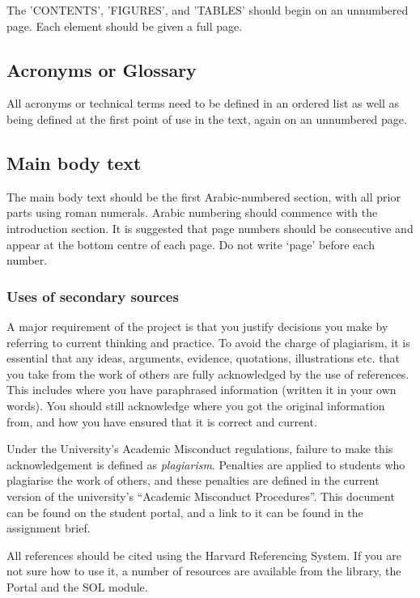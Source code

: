 The 'CONTENTS', 'FIGURES', and 'TABLES' should begin on an unnumbered page. Each element should be given a full page.

\subsection{Acronyms or Glossary}

All acronyms or technical terms need to be defined in an ordered list as well as being defined at the first point of use in the text, again on an unnumbered page.

\subsection{Main body text}

The main body text should be the first Arabic-numbered section, with all prior parts using roman numerals. Arabic numbering should commence with the introduction section. It is suggested that page numbers should be consecutive and appear at the bottom centre of each page. Do not write ‘page’ before each number.

\subsubsection{Uses of secondary sources}

A major requirement of the project is that you justify decisions you make by referring to current thinking and practice. To avoid the charge of plagiarism, it is essential that any ideas, arguments, evidence, quotations, illustrations etc. that you take from the work of others are fully acknowledged by the use of references. This includes where you have paraphrased information (written it in your own words). You should still acknowledge where you got the original information from, and how you have ensured that it is correct and current.

\begin{tcolorbox}
    Under the University’s Academic Misconduct regulations, failure to make this acknowledgement is defined as \textit{plagiarism}. Penalties are applied to students who plagiarise the work of others, and these penalties are defined in the current version of the university’s “Academic Misconduct Procedures”. This document can be found on the student portal, and a link to it can be found in the assignment brief.
\end{tcolorbox}

All references should be cited using the Harvard Referencing System. If you are not sure how to use it, a number of resources are available from the library, the Portal and the SOL module.


